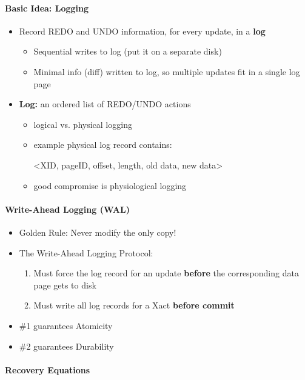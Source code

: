 \paragraph{Basic Idea: Logging}
\begin{itemize}
\item Record REDO and UNDO information, for every update, in a
  \textbf{log}
  \begin{itemize}
  \item Sequential writes to log (put it on a separate disk)
  \item Minimal info (diff) written to log, so multiple updates
    fit in a single log page
  \end{itemize}

\item \textbf{Log:} an ordered list of REDO/UNDO actions
  \begin{itemize}
  \item logical vs. physical logging
  \item example physical log record contains:

    {\color{blue} <XID, pageID, offset, length, old data, new data>}

  \item good compromise is physiological logging
  \end{itemize}
\end{itemize}

\paragraph{Write-Ahead Logging (WAL)}
\begin{itemize}
\item Golden Rule: Never modify the only copy!
\item The {\color{blue} Write-Ahead Logging} Protocol:
  \begin{enumerate}
  \item Must force the log record for an update \textbf{before} the
    corresponding data page gets to disk
  \item Must write all log records for a Xact \textbf{before commit}
  \end{enumerate}
\item \#1 guarantees Atomicity
\item \#2 guarantees Durability
\end{itemize}

\paragraph{Recovery Equations}

